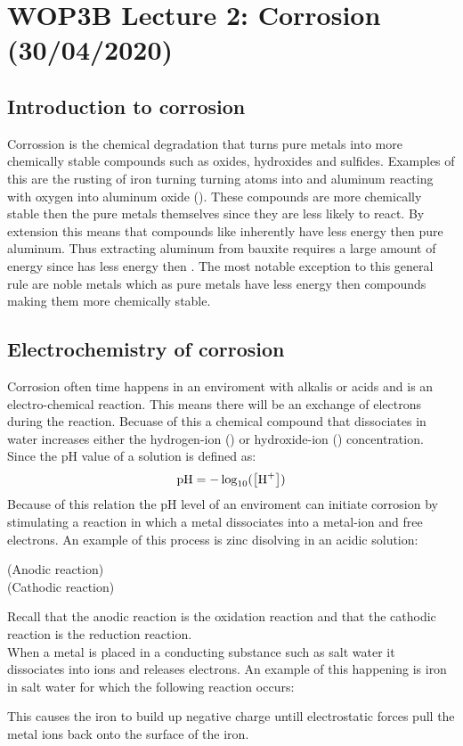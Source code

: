 \documentclass[11pt, a4paper]{article}
\begin{document}
\setcounter{section}{1}
\setcounter{equation}{0}
\section{WOP3B Lecture 2: Corrosion (30/04/2020)}


\subsection{Introduction to corrosion}
Corrossion is the chemical degradation that turns pure metals into more chemically stable compounds such as oxides, hydroxides and sulfides. Examples of this are the rusting of iron turning turning  atoms into  and aluminum reacting with oxygen into aluminum oxide (). These compounds are more chemically stable then the pure metals themselves since they are less likely to react. By extension this means that compounds like  inherently have less energy then pure aluminum. Thus extracting aluminum from bauxite requires a large amount of energy since  has less energy then . The most notable exception to this general rule are noble metals which as pure metals have less energy then compounds making them more chemically stable.


\subsection{Electrochemistry of corrosion}
Corrosion often time happens in an enviroment with alkalis or acids and is an electro-chemical reaction. This means there will be an exchange of electrons during the reaction. Becuase of this a chemical compound that dissociates in water increases either the hydrogen-ion () or hydroxide-ion () concentration. Since the pH value of a solution is defined as:
\begin{equation}
  \text{pH} = -\log_{10}(\left[ \ce{H^+} \right])
\end{equation}
Because of this relation the pH level of an enviroment can initiate corrosion by stimulating a reaction in which a metal dissociates into a metal-ion and free electrons. An example of this process is zinc disolving in an acidic solution:
\begin{center}
   (Anodic reaction)\\
   (Cathodic reaction)
\end{center}
Recall that the anodic reaction is the oxidation reaction and that the cathodic reaction is the reduction reaction.\\
When a metal is placed in a conducting substance such as salt water it dissociates into ions and releases electrons. An example of this happening is iron in salt water for which the following reaction occurs:
\begin{center}
\end{center}
This causes the iron to build up negative charge untill electrostatic forces pull the metal ions back onto the surface of the iron.
\end{document}
